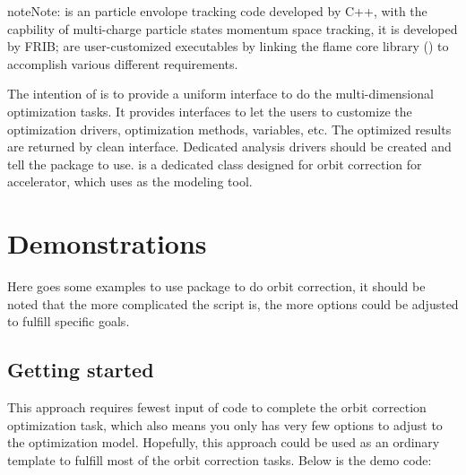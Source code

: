 \documentclass[letterpaper,10pt,english]{sphinxmanual}
\let\sphinxpxdimen\pdfpxdimen\else\newdimen\sphinxpxdimen
\begin{document}
\noindent{\hspace*{\fill}\sphinxincludegraphics[width=600\sphinxpxdimen]{{dakota-genopt-framework}.png}\hspace*{\fill}}

\begin{sphinxadmonition}{note}{Note:}
 is an particle envolope tracking code developed by C++,
with the capbility of multi-charge particle states momentum space
tracking, it is developed by FRIB;  are
user-customized executables by linking the flame core library
() to accomplish various different requirements.
\end{sphinxadmonition}

The intention of  is to provide a uniform interface to do the
multi-dimensional optimization tasks. It provides interfaces to let the
users to customize the optimization drivers, optimization methods,
variables, etc. The optimized results are returned by clean interface.
Dedicated analysis drivers should be created and tell the package to use.
 is a dedicated class designed for orbit correction for
accelerator, which uses  as the modeling tool.


\chapter{Demonstrations}
\label{\detokenize{src/demos::doc}}\label{\detokenize{src/demos:demonstrations}}
Here goes some examples to use  package to do orbit correction,
it should be noted that the more complicated the script is,
the more options could be adjusted to fulfill specific goals.


\section{Getting started}
\label{\detokenize{src/demos/demo1:getting-started}}\label{\detokenize{src/demos/demo1::doc}}\label{\detokenize{src/demos/demo1:simplest-approach}}
This approach requires fewest input of code to complete the orbit
correction optimization task, which also means you only has very few
options to adjust to the optimization model. Hopefully, this approach
could be used as an ordinary template to fulfill most of the orbit
correction tasks. Below is the demo code:
\end{document}
